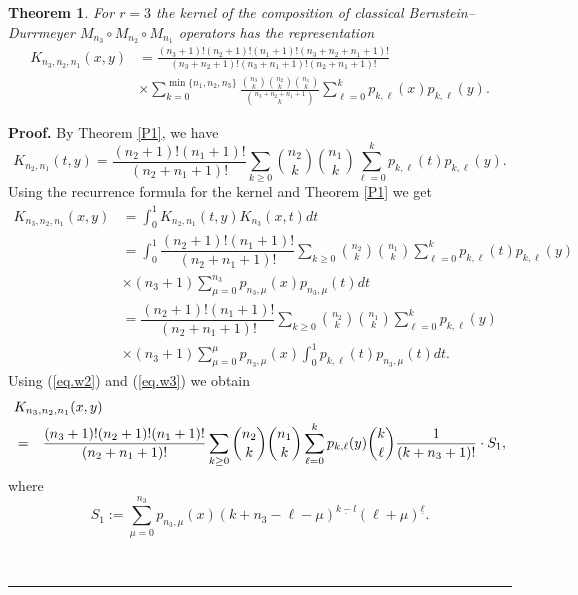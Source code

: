 \documentclass[12pt,reqno]{article}
\newtheorem{theorem}{Theorem}
\newenvironment{proof}[1][Proof]{\noindent\textbf{#1.} }{\ \rule{0.5em}{0.5em}}
\begin{document}
\begin{theorem}
For $r=3$ the kernel of the composition of classical Bernstein--Durrmeyer $%
M_{n_3}\circ M_{n_2}\circ M_{n_1}$ operators has the representation 
\begin{align*}
K_{n_3,n_2,n_1} \left( x,y\right) &=\frac{\left( n_3+1\right) !\left(
n_2+1\right) !\left( n_1+1\right) !\left( n_3+n_2+n_1+1\right) !}{\left(
n_3+n_2+1\right) !\left( n_3+n_1+1\right) !\left( n_2+n_1+1\right) !} \\
&\times \sum_{k= 0}^{\min \{n_1,n_2,n_3\}}\frac{\binom{n_3}{k}\binom{n_2}{k}%
\binom{n_1}{k}}{\binom{n_3+n_2+n_1+1}{k}}\sum_{\ell =0}^{k}p_{k,\ell }\left(
x\right) p_{k,\ell }\left( y\right).
\end{align*}
\end{theorem}

\begin{proof}
By Theorem \ref{P1}, we have 
\begin{equation*}
K_{n_{2},n_{1}}(t,y)=\dfrac{(n_{2}+1)!(n_{1}+1)!}{(n_{2}+n_{1}+1)!}%
\displaystyle \sum_{k\geq 0}{\binom{n_{2}}{k}}{\binom{n_{1}}{k}}\sum_{\ell
=0}^{k}p_{k,\ell }(t)p_{k,\ell }(y).
\end{equation*}%
Using the recurrence formula for the kernel and Theorem \ref{P1} we get 
\begin{align*}
K_{n_{3},n_{2},n_{1}}(x,y)& =\displaystyle%
\int_{0}^{1}K_{n_{2},n_{1}}(t,y)K_{n_{3}}(x,t)dt \\
& =\displaystyle \int_{0}^{1}\dfrac{(n_{2}+1)!(n_{1}+1)!}{(n_{2}+n_{1}+1)!}%
\sum_{k\geq 0}{\binom{n_{2}}{k}}{\binom{n_{1}}{k}}\sum_{\ell
=0}^{k}p_{k,\ell }(t)p_{k,\ell }(y) \\
& \times (n_{3}+1)\sum_{\mu =0}^{n_{3}}p_{n_{3},\mu }(x)p_{n_{3},\mu }(t)dt
\\
& =\dfrac{(n_{2}+1)!(n_{1}+1)!}{(n_{2}+n_{1}+1)!}\sum_{k\geq 0}{\binom{n_{2}%
}{k}}{\binom{n_{1}}{k}}\sum_{\ell =0}^{k}p_{k,\ell }(y) \\
& \times (n_{3}+1)\sum_{\mu =0}^{\mu }p_{n_{3},\mu }(x)\int_{0}^{1}p_{k,\ell
}(t)p_{n_{3},\mu }(t)dt.
\end{align*}%
Using (\ref{eq.w2}) and (\ref{eq.w3}) we obtain 
\begin{eqnarray*}
\lefteqn{K_{n_{3},n_{2},n_{1}}(x,y)} \\
&=&\dfrac{(n_{3}+1)!(n_{2}+1)!(n_{1}+1)!}{(n_{2}+n_{1}+1)!}\sum_{k\geq 0}{%
\binom{n_{2}}{k}}{\binom{n_{1}}{k}}\sum_{\ell =0}^{k}p_{k,\ell }(y){\binom{k%
}{\ell }}\dfrac{1}{(k+n_{3}+1)!}\cdot S_{1},
\end{eqnarray*}%
where 
\begin{equation*}
S_{1}:=\displaystyle \sum_{\mu =0}^{n_{3}}p_{n_{3},\mu }(x)(k+n_{3}-\ell
-\mu )^{\underline{k-l}}(\ell +\mu )^{\underline{\ell }}.
\end{equation*}


\end{proof}
\end{document}

